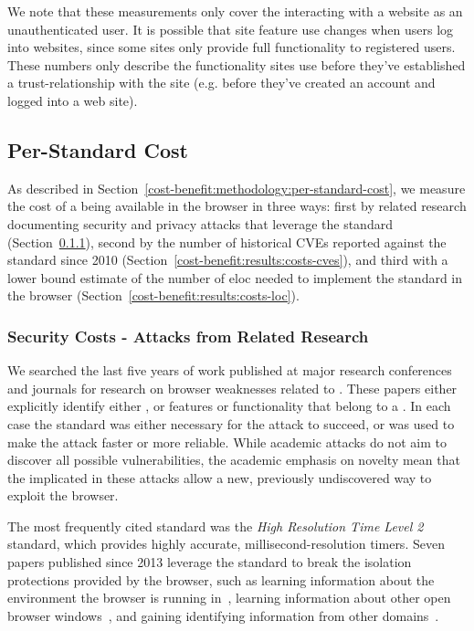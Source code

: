 We note that these measurements only cover the interacting with a website
as an unauthenticated user. It is possible that site feature use changes when
users log into websites, since some sites only provide full
functionality to registered users.  These numbers only describe the functionality
sites use before they've established a trust-relationship with the site (e.g.
before they've created an account and logged into a web site).


\subsection{Per-Standard Cost}
\label{cost-benefit:results:results-costs}
As described in Section~\ref{cost-benefit:methodology:per-standard-cost}, we measure the cost of a
\WAS being available in the browser in three ways: first by related research
documenting security and privacy attacks that leverage the standard
(Section~\ref{cost-benefit:results:costs-research}), second by the number of
historical CVEs reported against the standard since 2010
(Section~\ref{cost-benefit:results:costs-cves}), and third with a lower bound estimate of
the number of \gls{eloc} needed to implement the
standard in the browser (Section~\ref{cost-benefit:results:costs-loc}).


\subsubsection{Security Costs - Attacks from Related Research}
\label{cost-benefit:results:costs-research}

We searched the last five years of work published at major research
conferences and journals for research on browser weaknesses related
to \WASs.  These papers either explicitly identify either
\WASs, or features or functionality that belong to a \WAS.  In each case the standard
was either necessary for the attack to succeed, or was used to make the attack
faster or more reliable.  While academic attacks do not aim to discover all possible vulnerabilities,
the academic emphasis on novelty mean that the \WASs implicated in these attacks
allow a new, previously undiscovered way to exploit the browser.

The most frequently cited standard was the
\textit{High Resolution Time Level 2}~\cite{highres2016w3c} standard, which
provides highly accurate, millisecond-resolution timers.  Seven
papers published since 2013 leverage the standard to break the isolation protections provided
by the browser, such as learning information about the environment the browser
is running in~\cite{ho2014tick,oren2015spy,gruss2015practical}, learning information about
other open browser windows~\cite{andrysco2015subnormal,kotcher2013cross,gruss2015practical}, and gaining
identifying information from other domains~\cite{van2015clock}.

